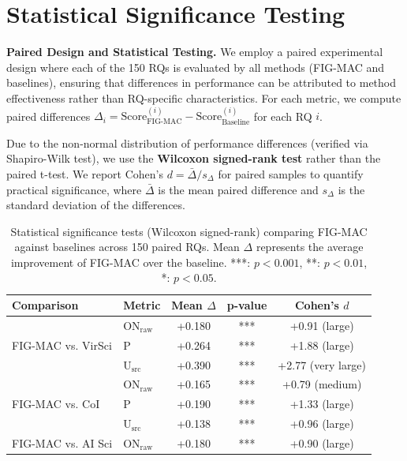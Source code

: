 \documentclass[runningheads]{llncs}
\begin{document}
\section{Statistical Significance Testing}
\label{app:statistical_testing}

\textbf{Paired Design and Statistical Testing.} We employ a paired experimental design where each of the 150 RQs is evaluated by all methods (FIG-MAC and baselines), ensuring that differences in performance can be attributed to method effectiveness rather than RQ-specific characteristics. For each metric, we compute paired differences $\Delta_i = \text{Score}_{\text{FIG-MAC}}^{(i)} - \text{Score}_{\text{Baseline}}^{(i)}$ for each RQ $i$.

Due to the non-normal distribution of performance differences (verified via Shapiro-Wilk test), we use the \textbf{Wilcoxon signed-rank test} rather than the paired t-test. We report Cohen's $d = \bar{\Delta} / s_{\Delta}$ for paired samples to quantify practical significance, where $\bar{\Delta}$ is the mean paired difference and $s_{\Delta}$ is the standard deviation of the differences.

\begin{table}[h]
\centering
\small
\begin{tabular}{llccc}
\toprule
\textbf{Comparison} & \textbf{Metric} & \textbf{Mean $\Delta$} & \textbf{p-value} & \textbf{Cohen's $d$} \\
\midrule
\multirow{3}{*}{FIG-MAC vs. VirSci} 
 & ON$_{\text{raw}}$ & +0.180 & *** & +0.91 (large) \\
 & P & +0.264 & *** & +1.88 (large) \\
 & U$_{\text{src}}$ & +0.390 & *** & +2.77 (very large) \\
\midrule
\multirow{3}{*}{FIG-MAC vs. CoI}
 & ON$_{\text{raw}}$ & +0.165 & *** & +0.79 (medium) \\
 & P & +0.190 & *** & +1.33 (large) \\
 & U$_{\text{src}}$ & +0.138 & *** & +0.96 (large) \\
\midrule
\multirow{1}{*}{FIG-MAC vs. AI Sci}
 & ON$_{\text{raw}}$ & +0.180 & *** & +0.90 (large) \\
\bottomrule
\end{tabular}
\caption{Statistical significance tests (Wilcoxon signed-rank) comparing FIG-MAC against baselines across 150 paired RQs. Mean $\Delta$ represents the average improvement of FIG-MAC over the baseline. ***: $p<0.001$, **: $p<0.01$, *: $p<0.05$.}
\label{tab:statistical_tests}
\end{table}
\end{document}
